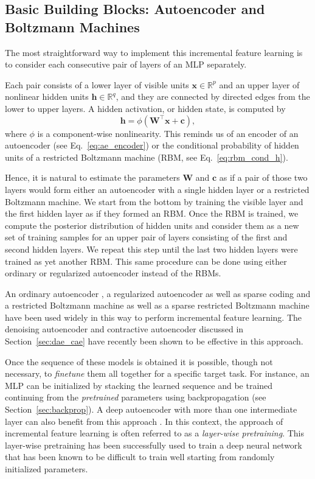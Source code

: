 \documentclass[dissertation,nocontribution,draft*]{aaltoseries}
\newcommand{\vect}[1]{\mathbf{#1}}
\newcommand{\matr}[1]{\mathbf{#1}}
\newcommand{\vc}[0]{\vect{c}}
\newcommand{\vh}[0]{\vect{h}}
\newcommand{\vx}[0]{\vect{x}}
\newcommand{\mW}[0]{\matr{W}}
\newcommand{\RR}[0]{\mathbb{R}}
\begin{document}
\subsection{Basic Building Blocks: Autoencoder and Boltzmann
Machines}
\label{sec:basic_blocks1}

The most straightforward way to implement this incremental
feature learning is to consider each consecutive pair of
layers of an MLP separately. 

Each pair consists of a lower layer of visible units $\vx
\in \RR^p$ and an upper layer of nonlinear hidden units $\vh
\in \RR^q$, and they are connected by directed edges from
the lower to upper layers. A hidden activation, or hidden
state, is computed by 
\[
\vh = \phi\left( \mW^\top \vx + \vc \right),
\]
where $\phi$ is a component-wise nonlinearity.  This reminds
us of an encoder of an autoencoder (see
Eq.~\eqref{eq:ae_encoder}) or the conditional probability of
hidden units of a restricted Boltzmann machine (RBM, see
Eq.~\eqref{eq:rbm_cond_h}).

Hence, it is natural to estimate the parameters $\mW$ and
$\vc$ as if a pair of those two layers would form either an
autoencoder with a single hidden layer or a restricted
Boltzmann machine. We start from the bottom by training the
visible layer and the first hidden layer as if they formed
an RBM. Once the RBM is trained, we compute the posterior
distribution of hidden units and consider them as a new set
of training samples for an upper pair of layers consisting
of the first and second hidden layers. We repeat this step
until the last two hidden layers were trained as yet
another RBM. This same procedure can be done using
either ordinary or regularized autoencoder instead of the
RBMs.

An ordinary autoencoder \citep[see, e.g.,][and
Section~\ref{sec:autoencoders}]{Bengio2007nips}, a
regularized autoencoder \citep[see, e.g.,][and
Section~\ref{sec:spaenc}]{Ranzato2008} as
well as sparse coding \citep[see, e.g.,][and
Section~\ref{sec:sparse_coding}]{Raina2007} and a restricted
Boltzmann machine \citep[see, e.g.,][and
Section~\ref{sec:rbm}]{Hinton2006} as well as a sparse
restricted Boltzmann machine \citep[see, e.g.,][]{Lee2007}
have been used widely in this way to perform incremental
feature learning. The denoising autoencoder
\citep{Vincent2010} and contractive autoencoder
\citep{Rifai2011} discussed in Section~\ref{sec:dae_cae}
have recently been shown to be effective in this approach.

Once the sequence of these models is obtained it is
possible, though not necessary, to \textit{finetune} them
all together for a specific target task. For instance, an
MLP can be initialized by stacking the learned sequence and
be trained continuing from the \textit{pretrained}
parameters using backpropagation (see
Section~\ref{sec:backprop}). A deep autoencoder with more
than one intermediate layer can also benefit from this
approach \citep{Hinton2006}. In this context, the approach
of incremental feature learning is often referred to as a
\textit{layer-wise pretraining}. This layer-wise pretraining
has been successfully used to train a deep neural network
that has been known to be difficult to train well
starting from randomly initialized parameters.
\end{document}
